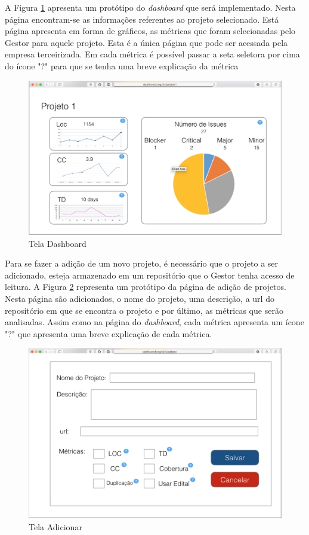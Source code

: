A Figura \ref{img:telaDashboard} apresenta um protótipo do \textit{dashboard} que será implementado. Nesta página encontram-se as informações referentes ao projeto selecionado. Está página apresenta em forma de gráficos, as métricas que foram selecionadas pelo Gestor para aquele projeto. Esta é a única página que pode ser acessada pela empresa terceirizada. Em cada métrica é possível passar a seta seletora por cima do ícone "?" para que se tenha uma breve explicação da métrica 

\graphicspath{{figuras/}}
\begin{figure}
\centering
\includegraphics[scale=0.60]{telaDashboard.png}
\caption{Tela Dashboard}
\label{img:telaDashboard}
\end{figure} 

Para se fazer a adição de um novo projeto, é necessário que o projeto a ser adicionado, esteja armazenado em um repositório que o Gestor tenha acesso de leitura. A Figura \ref{img:telaAdicionar} representa um protótipo da página de adição de projetos. Nesta página são adicionados, o nome do projeto, uma descrição, a url do repositório em que se encontra o projeto e por último, as métricas que serão analisadas. Assim como na página do \textit{dashboard}, cada métrica apresenta um ícone "?" que apresenta uma breve explicação de cada métrica.

\graphicspath{{figuras/}}
\begin{figure}
\centering
\includegraphics[scale=0.60]{telaAdicionar.png}
\caption{Tela Adicionar}
\label{img:telaAdicionar}
\end{figure} 

